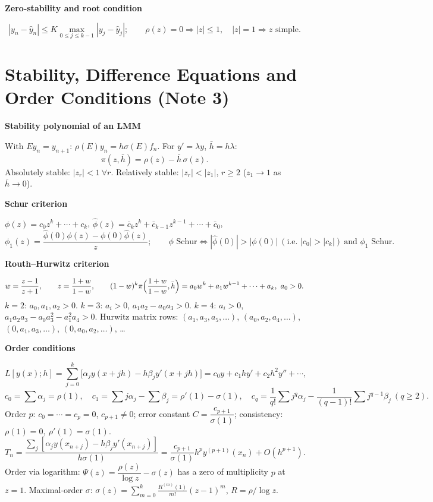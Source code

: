 \documentclass[10pt,a4paper]{article}
\newcommand{\hb}{\bar h}
\newcommand{\head}[1]{\par\smallskip\noindent\textbf{\color{blue!50!black}#1}\par\nobreak}
\begin{document}
\head{Zero-stability and root condition}
\[
  |y_n-\hat y_n|\le K\max_{0\le j\le k-1}|y_j-\hat y_j|;
  \qquad
  \rho(z)=0\Rightarrow|z|\le1,\quad |z|=1\Rightarrow z\text{ simple}.
\]

\section{Stability, Difference Equations and Order Conditions (Note 3)}

\head{Stability polynomial of an LMM}
With \(Ey_n=y_{n+1}\): \(\rho(E)y_n=h\sigma(E)f_n\). For \(y'=\lambda y\),
\(\hb=h\lambda\):
\[
  \pi(z,\hb)=\rho(z)-\hb\,\sigma(z).
\]
Absolutely stable: \(|z_r|<1\ \forall r\).\;
Relatively stable: \(|z_r|<|z_1|\), \(r\ge2\) (\(z_1\to1\) as \(\hb\to0\)).

\head{Schur criterion}
\(\phi(z)=c_0z^k+\cdots+c_k\),\quad
\(\hat\phi(z)=\bar c_kz^k+\bar c_{k-1}z^{k-1}+\cdots+\bar c_0\),
\[
  \phi_1(z)=\frac{\hat\phi(0)\phi(z)-\phi(0)\hat\phi(z)}{z};
  \qquad
  \phi\text{ Schur}\iff|\hat\phi(0)|>|\phi(0)|\ (\text{i.e. }|c_0|>|c_k|)\ \text{and }\phi_1\text{ Schur}.
\]

\head{Routh--Hurwitz criterion}
\[
  w=\frac{z-1}{z+1},\qquad z=\frac{1+w}{1-w},\qquad
  (1-w)^k\pi\Bigl(\frac{1+w}{1-w},\hb\Bigr)=a_0w^k+a_1w^{k-1}+\cdots+a_k,\ a_0>0.
\]
\(k=2\): \(a_0,a_1,a_2>0\).\;
\(k=3\): \(a_i>0\), \(a_1a_2-a_0a_3>0\).\;
\(k=4\): \(a_i>0\), \(a_1a_2a_3-a_0a_3^2-a_1^2a_4>0\).
Hurwitz matrix rows: \((a_1,a_3,a_5,\dots)\), \((a_0,a_2,a_4,\dots)\),
\((0,a_1,a_3,\dots)\), \((0,a_0,a_2,\dots)\), \dots

\head{Order conditions}
\[
  L[y(x);h]=\sum_{j=0}^k\bigl[\alpha_jy(x+jh)-h\beta_jy'(x+jh)\bigr]
  =c_0y+c_1hy'+c_2h^2y''+\cdots,
\]
\[
  c_0=\sum\alpha_j=\rho(1),\quad
  c_1=\sum j\alpha_j-\sum\beta_j=\rho'(1)-\sigma(1),\quad
  c_q=\frac1{q!}\sum j^q\alpha_j-\frac1{(q-1)!}\sum j^{q-1}\beta_j\ (q\ge2).
\]
Order \(p\): \(c_0=\cdots=c_p=0\), \(c_{p+1}\ne0\);\quad
error constant \(C=\dfrac{c_{p+1}}{\sigma(1)}\);\quad
consistency: \(\rho(1)=0,\ \rho'(1)=\sigma(1)\).
\[
  T_n=\frac{\sum_j[\alpha_jy(x_{n+j})-h\beta_jy'(x_{n+j})]}{h\sigma(1)}
  =\frac{c_{p+1}}{\sigma(1)}h^py^{(p+1)}(x_n)+O(h^{p+1}).
\]
Order via logarithm:
\(\Psi(z)=\dfrac{\rho(z)}{\log z}-\sigma(z)\) has a zero of multiplicity \(p\) at \(z=1\).
Maximal-order \(\sigma\):
\(\sigma(z)=\sum_{m=0}^k\frac{R^{(m)}(1)}{m!}(z-1)^m\), \(R=\rho/\log z\).
\end{document}
